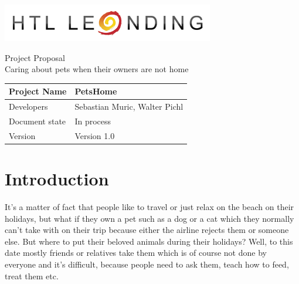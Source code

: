 \documentclass[12pt]{article}
\theoremstyle{definition}
\newenvironment{explanation}{%
}{}
\newcommand{\projectname}{PetsHome}
\newcommand{\productname}{Caring about pets when their owners are not home}
\newcommand{\developers}{Sebastian Muric, Walter Pichl}
\newcommand{\documentstatus}{In process}
\newcommand{\version}{Version 1.0}
\begin{document}
\begin{titlepage}
\begin{flushright}
\includegraphics[scale=.5]{htlleondinglogo.png}\\
\end{flushright}

\vspace{10em}

\begin{center}
{\Huge Project Proposal} \\[3em]
{\LARGE \productname} \\[3em]
\end{center}

\begin{flushleft}
\begin{tabular}{|l|l|}
\hline
Project Name & \projectname \\ \hline
Developers & \developers \\ \hline
Document state & \documentstatus \\ \hline
Version & \version \\ \hline
\end{tabular}
\end{flushleft}

\end{titlepage}
\pagebreak

\tableofcontents
\pagebreak

\section{Introduction}
\begin{explanation}
It's a matter of fact that people like to travel or just relax on the beach on their holidays, but what if they own a pet such as a dog or a cat which they normally can't take with on their trip because either the airline rejects them or someone else.
But where to put their beloved animals during their holidays? Well, to this date mostly friends or relatives take them which is of course not done by everyone and it's difficult, because people need to ask them, teach how to feed, treat them etc.
\end{explanation}
\end{document}

